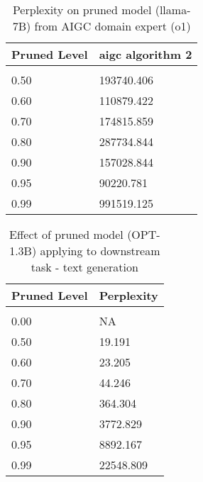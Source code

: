 \documentclass{article} %
\begin{document}
\begin{table}[t]
\caption{Perplexity on pruned model (llama-7B) from AIGC domain expert (o1)}
\label{table-5}
\begin{center}
\begin{tabular}{ll}
\multicolumn{1}{c}{\bf Pruned Level}  &\multicolumn{1}{c}{\bf aigc algorithm 2}
\\ \hline \\
0.50         &193740.406 \\
0.60         &110879.422 \\
0.70         &174815.859 \\
0.80         &287734.844 \\
0.90         &157028.844 \\
0.95         &90220.781 \\
0.99         &991519.125 \\
\end{tabular}
\end{center}
\end{table}

\begin{table}[t]
\caption{Effect of pruned model (OPT-1.3B) applying to downstream task - text generation}
\label{table-6}
\begin{center}
\begin{tabular}{ll}
\multicolumn{1}{c}{\bf Pruned Level}  &\multicolumn{1}{c}{\bf Perplexity}
\\ \hline \\
0.00         &NA \\
0.50         &19.191 \\
0.60         &23.205 \\
0.70         &44.246 \\
0.80         &364.304 \\
0.90         &3772.829 \\
0.95         &8892.167 \\
0.99         &22548.809 \\
\end{tabular}
\end{center}
\end{table}
\end{document}
